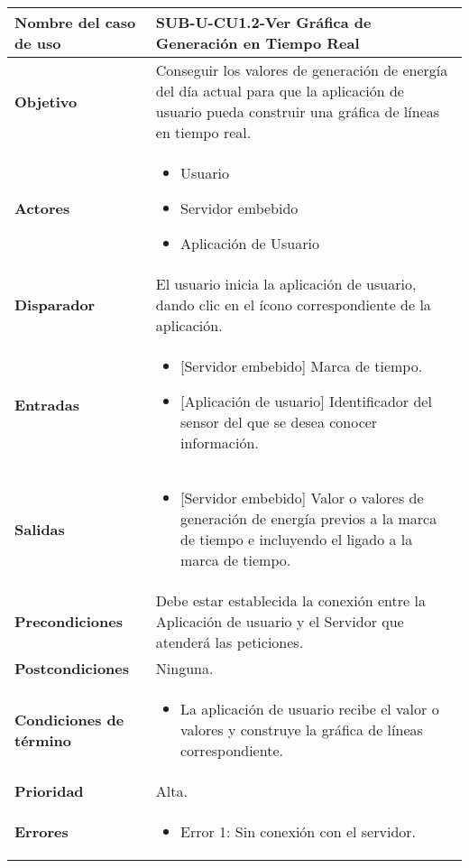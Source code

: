 \begin{longtable}{|J{5cm}|J{10.3cm}|}
	\hline
	\textbf{Nombre del caso de uso} &
		SUB-U-CU1.2-Ver Gráfica de Generación en Tiempo Real \\ \hline
	\textbf{Objetivo} &
		Conseguir los valores de generación de energía del día actual para que la aplicación de usuario pueda construir una gráfica de líneas en tiempo real. \\ \hline
	\textbf{Actores} &
		\begin{itemize}
		    \item Usuario
			\item Servidor embebido
			\item Aplicación de Usuario
		\end{itemize} \\ \hline
	\textbf{Disparador} & 
	    El usuario inicia la aplicación de usuario, dando clic en el ícono correspondiente de la aplicación.\\ \hline 
	\textbf{Entradas} & 
		\begin{itemize}
				\item{[Servidor embebido]} Marca de tiempo.
				\item{[Aplicación de usuario]} Identificador del sensor del que se desea conocer información.
		\end{itemize}\\ \hline 
	\textbf{Salidas} & 
		\begin{itemize}
			\item{[Servidor embebido]} Valor o valores de generación de energía previos a la marca de tiempo e incluyendo el ligado a la marca de tiempo.
		\end{itemize} \\ \hline
	\textbf{Precondiciones} &
		Debe estar establecida la conexión entre la Aplicación de usuario y el Servidor que atenderá las peticiones.
		\\ \hline
	\textbf{Postcondiciones} &
		Ninguna.\\ \hline
	\textbf{Condiciones de término} & 
		\begin{itemize}
			\item La aplicación de usuario recibe el valor o valores y construye la gráfica de líneas correspondiente.
		\end{itemize} \\ \hline 
	\textbf{Prioridad} & 
		Alta. \\ \hline
	\textbf{Errores} & 
		\begin{itemize}
		    \item \label{CUU1.2:Error1} Error 1: Sin conexión con el servidor.

\end{itemize}
\end{longtable}
